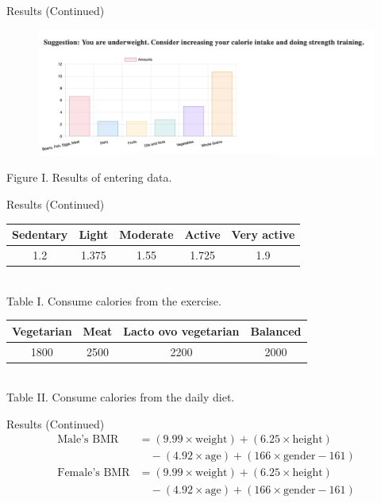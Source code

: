 \documentclass[fleqn]{beamer}
\begin{document}
\begin{frame}{Results (Continued)}
\begin{figure}[h]
    \centering
    \includegraphics[width=\textwidth]{Example.png}
\end{figure}
    \centering
    Figure I. Results of entering data.
\end{frame}
\begin{frame}{Results (Continued)}
\vspace{1.5cm}
\sloppy
\renewcommand{\arraystretch}{1.5}
\centering
\begin{tabular}{|c|c|c|c|c|}
\hline
\textbf{Sedentary} & \textbf{Light} & \textbf{Moderate} & \textbf{Active} & \textbf{Very active} \\
\hline
1.2 & 1.375 & 1.55 & 1.725 & 1.9 \\
\hline
\end{tabular}
\vspace{0.5cm} 
\\
Table I. Consume calories from the exercise. 
\vspace{1cm} 
\\
\begin{tabular}{|c|c|c|c|}
\hline
\textbf{Vegetarian} & \textbf{Meat} & \textbf{Lacto ovo vegetarian} & \textbf{Balanced} \\
\hline
1800 & 2500 & 2200 & 2000 \\
\hline
\end{tabular}
\vspace{0.5cm} 
\\
Table II. Consume calories from the daily diet. 
\vspace{1cm} 
\\
\end{frame}
\begin{frame}{Results (Continued)}
\sloppy
\begin{align*}
    \text{Male's BMR} &= (9.99 \times \text{weight}) + (6.25 \times \text{height}) \\
    &\quad - (4.92 \times \text{age}) + (166 \times \text{gender} - 161) \\
    \text{Female's BMR} &= (9.99 \times \text{weight}) + (6.25 \times \text{height}) \\
    &\quad - (4.92 \times \text{age}) + (166 \times \text{gender} - 161)
    \end{align*}
\end{frame}
\end{document}
